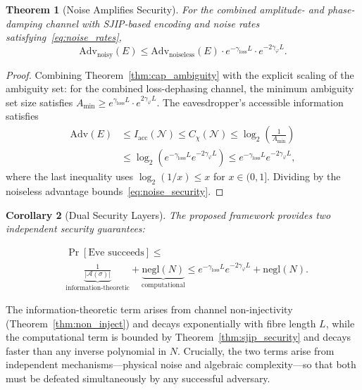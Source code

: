 \documentclass[journal,twocolumn]{IEEEtran}
\theoremstyle{definition}
\theoremstyle{plain}
\newtheorem{theorem}{Theorem}[section]
\newtheorem{corollary}[theorem]{Corollary}
\begin{document}
\begin{theorem}[Noise Amplifies Security]
\label{thm:noise_security}
For the combined amplitude- and phase-damping channel with
SJIP-based encoding and noise rates satisfying~\eqref{eq:noise_rates},
\begin{equation}
  \mathrm{Adv}_{\mathrm{noisy}}(E) \le
  \mathrm{Adv}_{\mathrm{noiseless}}(E)\cdot
  e^{-\gamma_{\mathrm{loss}}L}\cdot e^{-2\gamma_\varphi L}.
  \label{eq:noise_security}
\end{equation}
\end{theorem}

\begin{proof}
Combining Theorem~\ref{thm:cap_ambiguity} with the explicit scaling
of the ambiguity set: for the combined loss-dephasing channel, the
minimum ambiguity set size satisfies $A_{\min} \ge
e^{\gamma_{\mathrm{loss}}L} \cdot e^{2\gamma_\varphi L}$.
The eavesdropper's accessible information satisfies
\begin{align}
  \mathrm{Adv}(E) &\le I_{\mathrm{acc}}(\mathcal{N})
  \le C_\chi(\mathcal{N})
  \le \log_2\!\left(\frac{1}{A_{\min}}\right) \nonumber\\
  &\le \log_2\!\left(e^{-\gamma_{\mathrm{loss}}L}
    e^{-2\gamma_\varphi L}\right)
  \le e^{-\gamma_{\mathrm{loss}}L} e^{-2\gamma_\varphi L},
  \label{eq:noise_adv_proof}
\end{align}
where the last inequality uses $\log_2(1/x) \le x$ for
$x \in (0,1]$.  Dividing by the noiseless advantage
bounds~\eqref{eq:noise_security}.
\end{proof}

\begin{corollary}[Dual Security Layers]
\label{cor:dual_security}
The proposed framework provides two independent security guarantees:

\begin{equation}
\begin{split}
  &\Pr[\text{Eve succeeds}] \le\\&
  \underbrace{\frac{1}{|\mathcal{A}(\sigma)|}}_{\text{information-theoretic}}
  + \underbrace{\mathrm{negl}(N)}_{\text{computational}}
  \le e^{-\gamma_{\mathrm{loss}}L} e^{-2\gamma_\varphi L}
  + \mathrm{negl}(N).
  \label{eq:dual_security}
\end{split}
\end{equation}
\end{corollary}

The information-theoretic term arises from channel non-injectivity
(Theorem~\ref{thm:non_inject}) and decays exponentially with fibre
length $L$, while the computational term is bounded by
Theorem~\ref{thm:sjip_security} and decays faster than any inverse
polynomial in $N$.  Crucially, the two terms arise from independent
mechanisms---physical noise and algebraic complexity---so that both
must be defeated simultaneously by any successful adversary.
\end{document}
